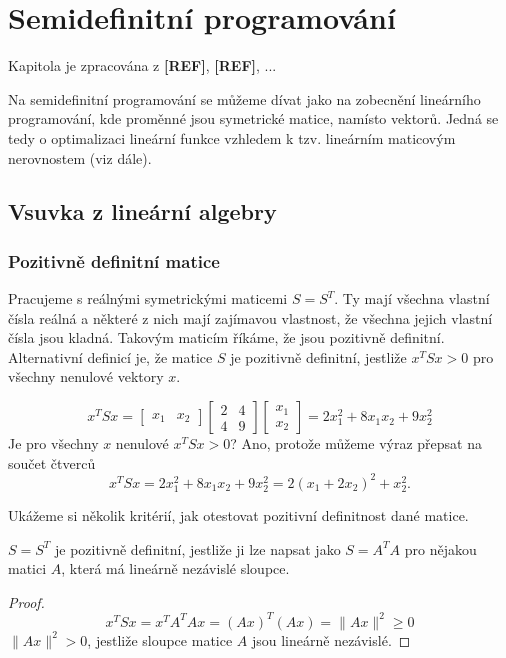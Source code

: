 \chapter{Semidefinitní programování}

Kapitola je zpracována z \textbf{[REF]}, \textbf{[REF]}, ...

Na semidefinitní programování se můžeme dívat jako na zobecnění lineárního programování, kde proměnné jsou symetrické matice, namísto vektorů. Jedná se tedy o optimalizaci lineární funkce vzhledem k tzv. lineárním maticovým nerovnostem (viz dále).

\section{Vsuvka z lineární algebry}

\subsection*{Pozitivně definitní matice}

Pracujeme s reálnými symetrickými maticemi $S = S^T$. Ty mají všechna vlastní čísla reálná a některé z nich mají zajímavou vlastnost, že všechna jejich vlastní čísla jsou kladná. Takovým maticím říkáme, že jsou pozitivně definitní. Alternativní definicí je, že matice $S$ je pozitivně definitní, jestliže $x^TSx > 0$ pro všechny nenulové vektory $x$.

\begin{pr}
$$
    x^T S x = 
    \begin{bmatrix}
        x_1 & x_2
    \end{bmatrix}
    \begin{bmatrix}
        2 & 4 \\
        4 & 9
    \end{bmatrix}
    \begin{bmatrix}
        x_1 \\
        x_2
    \end{bmatrix} =
    2 x_1^2 + 8 x_1 x_2 + 9 x_2^2
$$
Je pro všechny $x$ nenulové $x^TSx > 0$? Ano, protože můžeme výraz přepsat na součet čtverců
$$
    x^TSx = 2 x_1^2 + 8 x_1 x_2 + 9 x_2^2 = 2 (x_1 + 2 x_2)^2 + x_2^2.
$$
\end{pr}

Ukážeme si několik kritérií, jak otestovat pozitivní definitnost dané matice.

\begin{vt2}
    $S = S^T$ je pozitivně definitní, jestliže ji lze napsat jako $S = A^T A$ pro nějakou matici $A$, která má lineárně nezávislé sloupce.
\end{vt2}
\begin{proof}
    \begin{equation}
    \label{eq:tmp}
        x^TSx = x^TA^TAx = (Ax)^T(Ax) = \lVert Ax \rVert^2 \geq 0
    \end{equation}
    $\lVert Ax \rVert^2 > 0$, jestliže sloupce matice $A$ jsou lineárně nezávislé.
\end{proof}

